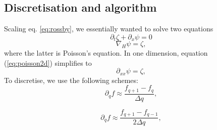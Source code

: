 \subsection{Discretisation and algorithm}
\label{sec:algo}
Scaling eq. \ref{eq:rossby}, we essentially wanted to solve two equations
	\begin{equation}
	\label{eq:betaplane}
		\partial_t \zeta + \partial_x \psi = 0
	\end{equation}
	\begin{equation}
		\label{eq:poisson2d}
		\nabla_H\psi = \zeta,
	\end{equation}
where the latter is Poisson's equation. In one dimension, equation (\ref{eq:poisson2d}) simplifies to
\begin{equation}
	\label{eq:poisson}
	\partial_{xx}\psi = \zeta,
\end{equation}
 To discretise, we use the following schemes:
	\begin{equation}
	\label{eq:explicit}
	\partial_q f \approx \frac{f_{q+1} - f_q}{\Delta q},
	\end{equation}

	\begin{equation}
	\label{eq:implicit}
		\partial_q f \approx \frac{f_{q+1} - f_{q-1}}{2\Delta q},
	\end{equation}

